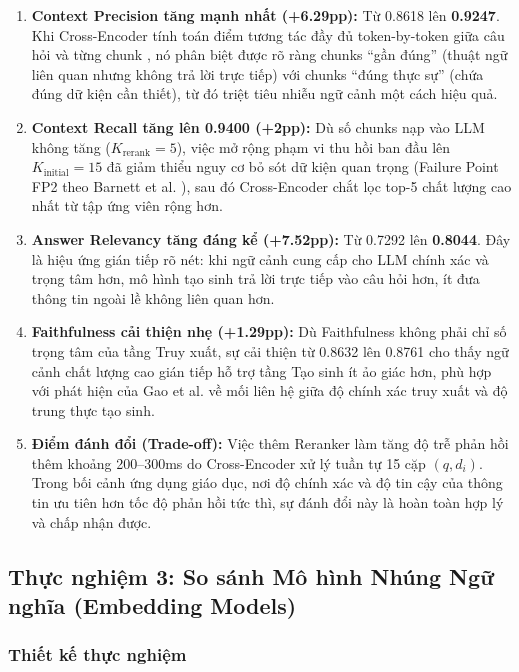 ﻿\documentclass[12pt]{article}
\begin{document}
\begin{enumerate}
    \item \textbf{Context Precision tăng mạnh nhất (+6.29pp):} Từ 0.8618 lên \textbf{0.9247}. Khi Cross-Encoder tính toán điểm tương tác đầy đủ token-by-token giữa câu hỏi và từng chunk \cite{chen2024bge_m3}, nó phân biệt được rõ ràng chunks ``gần đúng'' (thuật ngữ liên quan nhưng không trả lời trực tiếp) với chunks ``đúng thực sự'' (chứa đúng dữ kiện cần thiết), từ đó triệt tiêu nhiễu ngữ cảnh một cách hiệu quả.

    \item \textbf{Context Recall tăng lên 0.9400 (+2pp):} Dù số chunks nạp vào LLM không tăng ($K_{\text{rerank}} = 5$), việc mở rộng phạm vi thu hồi ban đầu lên $K_{\text{initial}} = 15$ đã giảm thiểu nguy cơ bỏ sót dữ kiện quan trọng (Failure Point FP2 theo Barnett et al. \cite{barnett2024seven_failures}), sau đó Cross-Encoder chắt lọc top-5 chất lượng cao nhất từ tập ứng viên rộng hơn.

    \item \textbf{Answer Relevancy tăng đáng kể (+7.52pp):} Từ 0.7292 lên \textbf{0.8044}. Đây là hiệu ứng gián tiếp rõ nét: khi ngữ cảnh cung cấp cho LLM chính xác và trọng tâm hơn, mô hình tạo sinh trả lời trực tiếp vào câu hỏi hơn, ít đưa thông tin ngoài lề không liên quan hơn.

    \item \textbf{Faithfulness cải thiện nhẹ (+1.29pp):} Dù Faithfulness không phải chỉ số trọng tâm của tầng Truy xuất, sự cải thiện từ 0.8632 lên 0.8761 cho thấy ngữ cảnh chất lượng cao gián tiếp hỗ trợ tầng Tạo sinh ít ảo giác hơn, phù hợp với phát hiện của Gao et al. \cite{gao2023alce} về mối liên hệ giữa độ chính xác truy xuất và độ trung thực tạo sinh.

    \item \textbf{Điểm đánh đổi (Trade-off):} Việc thêm Reranker làm tăng độ trễ phản hồi thêm khoảng 200--300ms do Cross-Encoder xử lý tuần tự 15 cặp $(q, d_i)$. Trong bối cảnh ứng dụng giáo dục, nơi độ chính xác và độ tin cậy của thông tin ưu tiên hơn tốc độ phản hồi tức thì, sự đánh đổi này là hoàn toàn hợp lý và chấp nhận được.
\end{enumerate}

\subsection{Thực nghiệm 3: So sánh Mô hình Nhúng Ngữ nghĩa (Embedding Models)}

\subsubsection{Thiết kế thực nghiệm}
\end{document}
